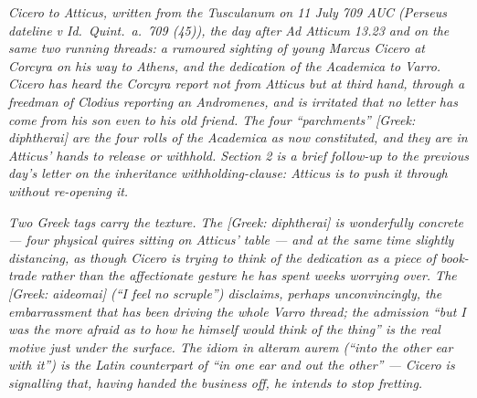 
\textit{Cicero to Atticus, written from the Tusculanum
on 11 July 709 AUC (Perseus dateline \textit{v Id.\
Quint.\ a.\ 709 (45)}), the day after Ad Atticum 13.23
and on the same two running threads: a rumoured
sighting of young Marcus Cicero at Corcyra on his way
to Athens, and the dedication of the
\textit{Academica} to Varro. Cicero has heard the
Corcyra report not from Atticus but at third hand,
through a freedman of Clodius reporting an Andromenes,
and is irritated that no letter has come from his son
even to his old friend. The four ``parchments''
\textit{[Greek: diphtherai]} are the four rolls of the
\textit{Academica} as now constituted, and they are in
Atticus' hands to release or withhold. Section 2 is a
brief follow-up to the previous day's letter on the
inheritance withholding-clause: Atticus is to push it
through without re-opening it.}

\textit{Two Greek tags carry the texture. The
\textit{[Greek: diphtherai]} is wonderfully concrete
--- four physical quires sitting on Atticus' table ---
and at the same time slightly distancing, as though
Cicero is trying to think of the dedication as a piece
of book-trade rather than the affectionate gesture he
has spent weeks worrying over. The
\textit{[Greek: aideomai]} (``I feel no scruple'')
disclaims, perhaps unconvincingly, the embarrassment
that has been driving the whole Varro thread; the
admission ``but I was the more afraid as to how he
himself would think of the thing'' is the real motive
just under the surface. The idiom \textit{in alteram
aurem} (``into the other ear with it'') is the Latin
counterpart of ``in one ear and out the other'' ---
Cicero is signalling that, having handed the
business off, he intends to stop fretting.}
